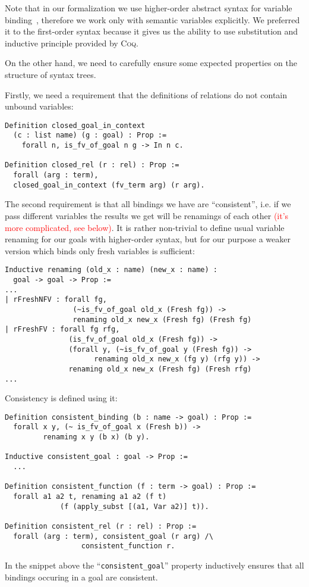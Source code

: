 Note that in our formalization we use higher-order abstract syntax for variable binding~\cite{HOAS}, {\color{blue} therefore we work only with semantic variables explicitly}. We preferred it to the first-order syntax because it gives us the ability to use substitution and inductive principle provided by \textsc{Coq}.
{ \color{blue} On the other hand, we need to carefully ensure some expected properties on the structure of syntax trees. 

Firstly, we need a requirement that the definitions of relations do not contain unbound variables:

\begin{lstlisting}[language=Coq,basicstyle=\footnotesize]
Definition closed_goal_in_context 
  (c : list name) (g : goal) : Prop :=
    forall n, is_fv_of_goal n g -> In n c.

Definition closed_rel (r : rel) : Prop :=
  forall (arg : term),
  closed_goal_in_context (fv_term arg) (r arg).
\end{lstlisting}

The second requirement is that all bindings we have are ``consistent'', i.e. if we pass different variables the results we get will be renamings of each other \textcolor{red}{(it's more complicated, see below)}. It is rather non-trivial to define usual variable renaming for our goals with higher-order syntax, but for our purpose a weaker version which binds only fresh variables is sufficient:

\begin{lstlisting}[language=Coq,basicstyle=\footnotesize]
Inductive renaming (old_x : name) (new_x : name) :
  goal -> goal -> Prop :=
...
| rFreshNFV : forall fg,
                (~is_fv_of_goal old_x (Fresh fg)) ->
                renaming old_x new_x (Fresh fg) (Fresh fg)
| rFreshFV : forall fg rfg,
               (is_fv_of_goal old_x (Fresh fg)) ->
               (forall y, (~is_fv_of_goal y (Fresh fg)) ->
                     renaming old_x new_x (fg y) (rfg y)) ->
               renaming old_x new_x (Fresh fg) (Fresh rfg)
...
\end{lstlisting}

Consistency is defined using it:

\begin{lstlisting}[language=Coq,basicstyle=\footnotesize]
Definition consistent_binding (b : name -> goal) : Prop :=
  forall x y, (~ is_fv_of_goal x (Fresh b)) ->
         renaming x y (b x) (b y).

Inductive consistent_goal : goal -> Prop :=
  ...

Definition consistent_function (f : term -> goal) : Prop :=
  forall a1 a2 t, renaming a1 a2 (f t)
             (f (apply_subst [(a1, Var a2)] t)).

Definition consistent_rel (r : rel) : Prop :=
  forall (arg : term), consistent_goal (r arg) /\
                  consistent_function r.
\end{lstlisting}

In the snippet above the ``\lstinline[language=Coq]{consistent_goal}'' property inductively ensures that all bindings occuring in a goal are consistent.
}

